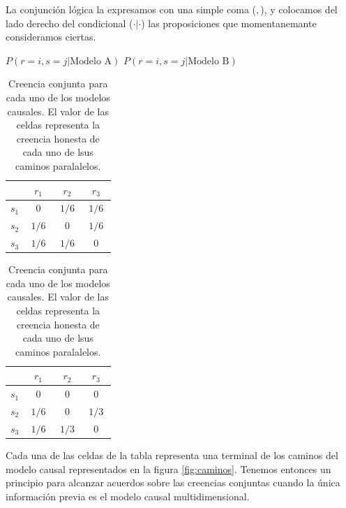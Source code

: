 \documentclass[a4paper,10pt]{book}
\theoremstyle{definition}
\begin{document}
%
La conjunci\'on l\'ogica la expresamos con una simple coma ($,$), y colocamos del lado derecho del condicional ($\cdot|\cdot$) las proposiciones que momentanemante consideramos ciertas.
%
\begin{table}[H]
\centering
$P(r=i, s=j | \text{Modelo A})$ \hspace{1.8cm} $P(r=i, s=j | \text{Modelo B})$ \\[0.1cm]
 \begin{tabular}{|c|c|c|c|} \hline \setlength\tabcolsep{0.4cm}
       & \, $r_1$ \, &  \, $r_2$ \, & \, $r_3$ \, \\ \hline 
  $s_1$ & $0$ & $1/6$ & $1/6$  \\ \hline
  $s_2$ & $1/6$ & $0$ & $1/6$  \\ \hline
  $s_3$ & $1/6$ & $1/6$ & $0$ \\ \hline 
  \end{tabular}
  \hspace{1.5cm}
  \begin{tabular}{|c|c|c|c|} \hline  \setlength\tabcolsep{0.4cm} 
 & \, $r_1$ \, &  \, $r_2$ \, & \, $r_3$ \,  \\ \hline 
  $s_1$ & $0$ & $0$ & $0$ \\ \hline
  $s_2$ & $1/6$ & $0$ & $1/3$ \\ \hline
  $s_3$ & $1/6$ & $1/3$ & $0$  \\ \hline  
  \end{tabular}
  \caption{Creencia conjunta para cada uno de los modelos causales. El valor de las celdas representa la creencia honesta de cada uno de lsus caminos paralalelos. }
  \label{tab:creencia_conjunta}
\end{table}
%
Cada una de las celdas de la tabla representa una terminal de los caminos del modelo causal representados en la figura \ref{fig:caminos}.
Tenemos entonces un principio para alcanzar acuerdos sobre las creencias conjuntas cuando la única informaci\'on previa es el modelo causal multidimensional.
\end{document}

